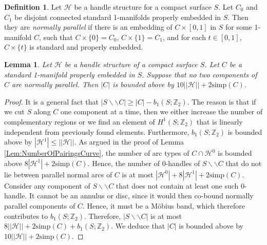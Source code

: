 \documentclass[oneside]{amsart}
\numberwithin{equation}{section}
\theoremstyle{plain}
\newtheorem{lemma}[equation]{Lemma}
\theoremstyle{definition}
\newtheorem{definition}[equation]{Definition}
\newcommand{\cut}{\backslash\backslash}
\newcommand{\calH}{\mathcal{H}}
\begin{document}


\begin{definition}
Let $\calH$ be a handle structure for a compact surface $S$. 
Let $C_0$ and $C_1$ be disjoint connected standard 1-manifolds properly embedded in $S$. Then they are \emph{normally parallel} if there is an 
embedding of $C \times [0,1]$ in $S$ for some 1-manifold $C$, such that $C \times \{ 0 \} = C_0$, $C \times \{ 1 \} = C_1$, and for each $t \in [0,1]$,
$C \times \{ t \}$ is standard and properly embedded.
\end{definition}

\begin{lemma}
\label{Lem:NumberOfCurveComponents}
Let $\calH$ be a handle structure of a compact surface $S$. Let $C$ be a standard 1-manifold properly embedded in $S$. Suppose that no two components of $C$ are normally parallel. Then $|C|$ is bounded above by $10 ||\calH|| + 2 \mathrm{simp}(C)$.
\end{lemma}

\begin{proof}
It is a general fact that $|S \cut C| \geq |C| - b_1(S;\mathbb{Z}_2)$. The reason is that if we cut $S$ along $C$ one component at a time, then we either increase the number of complementary regions or we find an element of $H^1(S;\mathbb{Z}_2)$ that is linearly independent from previously found elements. Furthermore, $b_1(S;\mathbb{Z}_2)$ is bounded above by $|\calH^1| \leq ||\calH||$. As argued in the proof of  Lemma \ref{Lem:NumberOfPairingsCurve}, the number of arc types of $C \cap \calH^0$ is bounded above $8|\calH^1| + 2\mathrm{simp}(C)$. Hence, the number of 0-handles of $S \cut C$ that do not lie between parallel normal arcs of $C$ is at most $|\calH^0| + 8 |\calH^1| + 2\mathrm{simp}(C)$. Consider any component of $S \cut C$ that does not contain at least one such 0-handle. It cannot be an annulus or disc, since it would then co-bound normally parallel components of $C$. Hence, it must be a M\"obius band, which therefore contributes to $b_1(S;\mathbb{Z}_2)$. Therefore, $|S \cut C|$ is at most $8||\calH|| + 2\mathrm{simp}(C) + b_1(S;\mathbb{Z}_2)$. We deduce that $|C|$ is bounded above by $10||\calH|| + 2\mathrm{simp}(C)$.
\end{proof}
\end{document}
